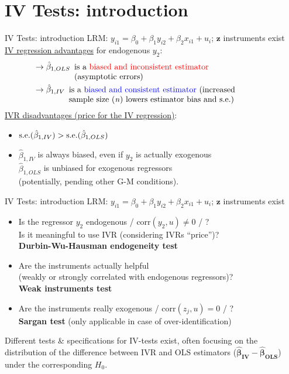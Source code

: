 \documentclass[usenames,dvipsnames]{beamer}
\begin{document}
\section{IV Tests: introduction}
\begin{frame}{IV Tests: introduction}
LRM: $y_{i1}=\beta_0+\beta_1 y_{i2}+\beta_2 x_{i1}+u_i$; \quad $\bm{z}$ instruments exist \\
\vspace{0.3cm}
\underline{IV regression advantages} for endogenous $y_2$:
\vspace{-0.2cm}
\begin{align*}
& \rightarrow \hat{\beta}_{1,OLS} \enspace \parbox[t]{24em}{ is a \textcolor{red}{biased and inconsistent estimator} \\(asymptotic errors)}\\
 & \rightarrow \hat{\beta}_{1, IV} \enspace \parbox[t]{24em}{ is a \textcolor{blue}{biased and consistent estimator} (increased \\sample size (\textit{n}) lowers estimator bias and s.e.)} 
\end{align*}
\underline{IVR disadvantages (price for the IV regression)}:
\begin{itemize}
\item $\textnormal{s.e.}(\hat{\beta}_{1, IV}) > \textnormal{s.e.}(\hat{\beta}_{1, OLS})$
\item $\hat{\beta}_{1, IV}$ is always biased, even if $y_2$ is actually exogenous\\
$\hat{\beta}_{1, OLS}$ is unbiased for exogenous regressors \\ 
\small (potentially, pending other G-M conditions).
\end{itemize}
\end{frame}
\begin{frame}{IV Tests: introduction}
LRM: $y_{i1}=\beta_0+\beta_1 y_{i2}+\beta_2 x_{i1}+u_i$; \quad $\bm{z}$ instruments exist
\medskip
\begin{itemize}
\item Is the regressor $y_2$ endogenous / $\mathrm{corr}(y_2, u) \neq 0$ / ? \\
Is it meaningful to use IVR (considering IVRs ``price'')?\\
\textbf{Durbin-Wu-Hausman endogeneity test}\\
\item Are the instruments actually helpful\\
(weakly or strongly correlated with endogenous regressors)? \\
\textbf{Weak instruments test}\\
\item Are the instruments really exogenous / $\mathrm{corr}(z_j, u)=0$ / ?\\
\textbf{Sargan test} (only applicable in case of over-identification)\\
\end{itemize}
\medskip
\small Different tests \& specifications for IV-tests exist, often focusing on the distribution of the difference between IVR and OLS estimators ($\bm{\hat{\beta}_{IV}}-\bm{\hat{\beta}_{OLS}}$) under the corresponding $H_0$.
\end{frame}
\end{document}
